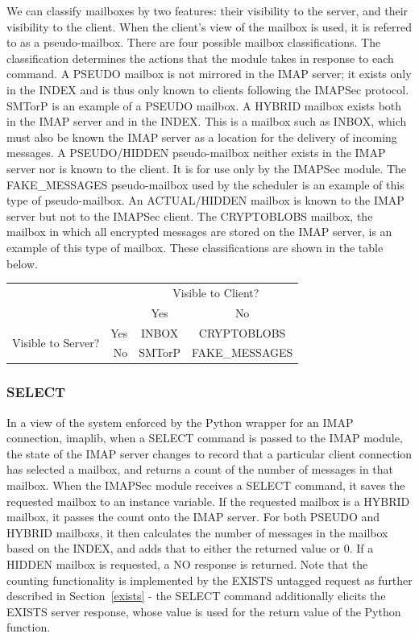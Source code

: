 \documentclass[pageno]{jpaper}
\newcommand{\project}{IMAPSec }
\begin{document}
We can classify mailboxes by two features: their visibility to the server, and their visibility to the client. When the client's view of the mailbox is used, it is referred to as a pseudo-mailbox. There are four possible mailbox classifications. The classification determines the actions that the module takes in response to each command. A PSEUDO mailbox is not mirrored in the IMAP server; it exists only in the INDEX and is thus only known to clients following the \project protocol. SMTorP is an example of a PSEUDO mailbox. A HYBRID mailbox exists both in the IMAP server and in the INDEX. This is a mailbox such as INBOX, which must also be known the IMAP server as a location for the delivery of incoming messages. A PSEUDO/HIDDEN pseudo-mailbox neither exists in the IMAP server nor is known to the client. It is for use only by the \project module. The FAKE\_MESSAGES pseudo-mailbox used by the scheduler is an example of this type of pseudo-mailbox. An ACTUAL/HIDDEN mailbox is known to the IMAP server but not to the \project client. The CRYPTOBLOBS mailbox, the mailbox in which all encrypted messages are stored on the IMAP server, is an example of this type of mailbox. These classifications are shown in the table below.

\begin{tabular}{ rr|c|c| }

 &\multicolumn{1}{r}{} & \multicolumn{2}{c}{Visible to Client?} \\

&\multicolumn{1}{r}{}
 &  \multicolumn{1}{c}{Yes}
 & \multicolumn{1}{c}{No} \\
\cline{3-4}
\multirow{2}{*}{Visible to Server?} & Yes & INBOX & CRYPTOBLOBS \\
\cline{3-4}
& No & SMTorP & FAKE\_MESSAGES \\
\cline{3-4}
\end{tabular}

\subsubsection{SELECT}
\label{select}

In a view of the system enforced by the Python wrapper for an IMAP connection, imaplib, when a SELECT command is passed to the IMAP module, the state of the IMAP server changes to record that a particular client connection has selected a mailbox, and returns a count of the number of messages in that mailbox. When the \project module receives a SELECT command, it saves the requested mailbox to an instance variable. If the requested mailbox is a HYBRID mailbox, it passes the count onto the IMAP server. For both PSEUDO and HYBRID mailboxs, it then calculates the number of messages in the mailbox based on the INDEX, and adds that to either the returned value or 0. If a HIDDEN mailbox is requested, a NO response is returned. Note that the counting functionality is implemented by the EXISTS untagged request as further described in Section~\ref{exists} - the SELECT command additionally elicits the EXISTS server response, whose value is used for the return value of the Python function.
\end{document}
